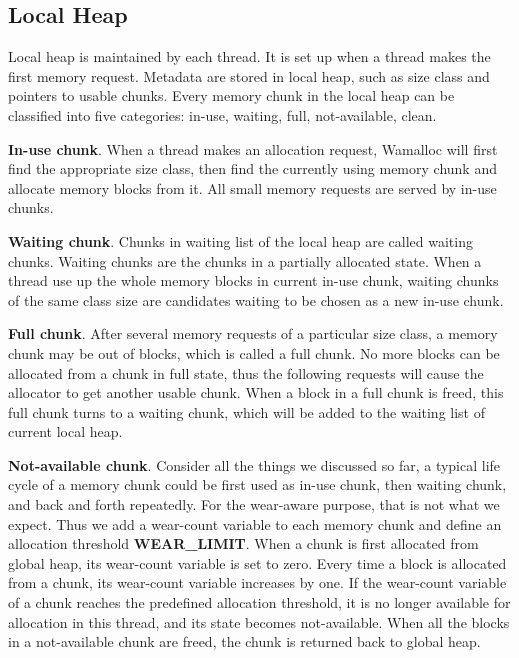 \documentclass[10pt, conference, compsocconf]{IEEEtran}
\begin{document}
\subsection{Local Heap}

Local heap is maintained by each thread. 
It is set up when a thread makes the first memory request.
Metadata are stored in local heap, such as size class and pointers to usable chunks.
Every memory chunk in the local heap can be classified into five categories: in-use, waiting, full, not-available, clean.


\textbf{In-use chunk}. 
When a thread makes an allocation request, 
Wamalloc will first find the appropriate size class, 
then find the currently using memory chunk and allocate memory blocks from it.
All small memory requests are served by in-use chunks.

\textbf{Waiting chunk}. 
Chunks in waiting list of the local heap are called waiting chunks. 
Waiting chunks are the chunks in a partially allocated state. 
When a thread use up the whole memory blocks in current in-use chunk,
waiting chunks of the same class size are candidates waiting to be chosen as a new in-use chunk.

\textbf{Full chunk}. 
After several memory requests of a particular size class, 
a memory chunk may be out of blocks, which is called a full chunk.
No more blocks can be allocated from a chunk in full state, 
thus the following requests will cause the allocator to get another usable chunk.
When a block in a full chunk is freed,
this full chunk turns to a waiting chunk, which will be added to the waiting list of current local heap.

\textbf{Not-available chunk}.
Consider all the things we discussed so far, 
a typical life cycle of a memory chunk could be first used as in-use chunk, then waiting chunk, and back and forth repeatedly. 
For the wear-aware purpose, that is not what we expect. 
Thus we add a wear-count variable to each memory chunk and define an allocation threshold \textbf{WEAR\_LIMIT}.
When a chunk is first allocated from global heap, its wear-count variable is set to zero.
Every time a block is allocated from a chunk, its wear-count variable increases by one. 
If the wear-count variable of a chunk reaches the predefined allocation threshold, 
it is no longer available for allocation in this thread, and its state becomes not-available. 
When all the blocks in a not-available chunk are freed,
the chunk is returned back to global heap.
\end{document}
